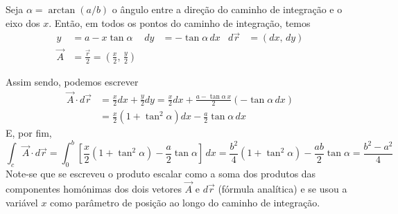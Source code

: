 \begin{examples}
\hfill
\begin{minipage}[t]{0.8\linewidth}
Seja $\alpha=\arctan(a/b)$ o ângulo entre a direção do caminho de integração e o
eixo dos $x$. Então, em todos os pontos do caminho de integração, temos
\begin{align*}
y&=a-x\tan\alpha & dy&=-\tan\alpha\,dx & d\vec r&=(dx,\,dy)\\
\vec A&=\frac{\vec r}{2}= \left(\frac{x}{2},\,\frac{y}{2}\right)
\end{align*}
\end{minipage}
Assim sendo, podemos escrever
\begin{align*}
\vec A\cdot d\vec r&=\frac{x}{2}dx+\frac{y}{2}dy=\frac{x}{2}dx+
\frac{a-\tan\alpha\,x}{2}(-\tan\alpha\,dx)\\
&=\frac{x}{2}\left(1+\tan^2\alpha\right)dx-\frac{a}{2}\tan\alpha\,dx
\end{align*}
E, por fim,
\begin{equation*}
\int_c\vec A\cdot d\vec r=\int_0^b\left[
\frac{x}{2}\left(1+\tan^2\alpha\right)-\frac{a}{2}\tan\alpha\right]\,dx=
\frac{b^2}{4}\left(1+\tan^2\alpha\right)-\frac{ab}{2}\tan\alpha
=\frac{b^2-a^2}{4}
\end{equation*}
Note-se que se escreveu o produto escalar como a soma dos produtos das
componentes homónimas dos dois vetores $\vec A$ e $d\vec r$ (fórmula analítica)
e se usou a variável $x$ como parâmetro de posição ao longo do caminho de
integração.
\end{examples}


